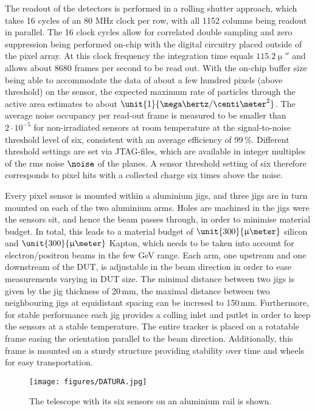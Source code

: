 The readout of the \Mimosa detectors is performed in a rolling shutter approach, which takes 16 cycles of an 80 MHz clock per row, with all 1152 columns being readout in parallel. 
The 16 clock cycles allow for correlated double sampling and zero suppression being performed on-chip with the digital circuitry placed outside of the pixel array.
At this clock frequency the \Mimosa integration time equals $\unit{115.2}{\upmu\second}$ and allows about 8680 frames per second to be read out. 
With the on-chip buffer size being able to accommodate the data of about a few hundred pixels (above threshold) on the sensor,
the expected maximum rate of particles through the active area estimates to about $\unit{1}{\mega\hertz/\centi\meter^2}$. 
The average noise occupancy per read-out frame is measured to be smaller than $2\cdot10^{-5}$ for non-irradiated sensors at room temperature at the signal-to-noise threshold level of six,
 consistent with an average efficiency of 99\,\%. 
Different threshold settings are set via JTAG-files, which are available in integer multiples of the rms noise $\noise$ of the planes. 
A sensor threshold setting of six therefore corresponds to pixel hits with a collected charge six times above the noise. 

Every pixel sensor is mounted within a aluminium jigs, and three jigs are in turn mounted on each of the two aluminium arms. 
Holes are machined in the jigs were the sensors sit, and hence the beam passes through, in order to minimise material budget. 
In total, this leads to a material budget of $\unit{300}{\upmu\meter}$ silicon and $\unit{300}{\upmu\meter}$ Kapton, which needs to be taken into account for electron/positron beams in the few GeV range. 
Each arm, one upstream and one downstream of the DUT, is adjustable in the beam direction in order to ease measurements varying in DUT size.
The minimal distance between two jigs is given by the jig thickness of 20\,mm, the maximal distance between two neighbouring jigs at equidistant spacing can be incresed to 150\,mm.
Furthermore, for stable performance each jig provides a colling inlet and putlet in order to keep the \Mimosa sensors at a stable temperature. 
The entire tracker is placed on a rotatable frame easing the orientation parallel to the beam direction. 
Additionally, this frame is mounted on a sturdy structure providing stability over time and wheels for easy transportation. 

\begin{figure}[tb]
	\center
	\texttt{[image: figures/DATURA.jpg]}
	\caption[The \Datura telescope]{The \Datura telescope with its six \Mimosa sensors on an aluminium rail is shown.}
	\label{fig:datura-tscope}
\end{figure}

